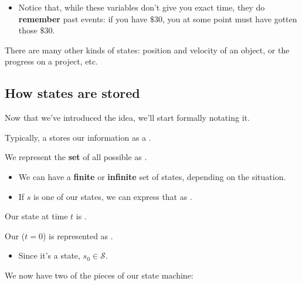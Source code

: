         \begin{itemize}
            \item Notice that, while these variables don't give you exact time, they do \textbf{remember} past events: if you have $\$30$, you at some point must have gotten those $\$30$.
        \end{itemize}
        
        There are many other kinds of states: position and velocity of an object, or the progress on a project, etc.




    \phantom{}

    \subsection{How states are stored}

        Now that we've introduced the idea, we'll start formally notating it.\\

        \begin{notation}
            Typically, a   stores our information as a .
            
            We represent the \textbf{set} of all possible  as . 
            
            \begin{itemize}
                \item We can have a \textbf{finite} or \textbf{infinite} set of states, depending on the situation.
                \item If $s$ is one of our states, we can express that as .
            \end{itemize}

            \subsecdiv
            
            Our state at time $t$ is .
            
            Our  ($t=0$) is represented as .         
            \begin{itemize}
                \item Since it's a state, $s_0 \in \mathcal{S}$.
            \end{itemize}
        \end{notation}

        We now have two of the pieces of our state machine:
            

